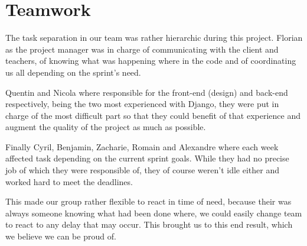 \section{Teamwork}
\label{sec:Teamwork}


The task separation in our team was rather hierarchic during this project. Florian as the project manager was in charge of communicating with the client and teachers, of knowing what was happening where in the code and of coordinating us all depending on the sprint's need. 

Quentin and Nicola where responsible for the front-end (design) and back-end respectively, being the two most experienced with Django, they were put in charge of the most difficult part so that they could benefit of that experience and augment the quality of the project as much as possible. 

Finally Cyril, Benjamin, Zacharie, Romain and Alexandre where each week affected task depending on the current sprint goals. While they had no precise job of which they were responsible of, they of course weren't idle either and worked hard to meet the deadlines.

This made our group rather flexible to react in time of need, because their was always someone knowing what had been done where, we could easily change team to react to any delay that may occur. This brought us to this end result, which we believe we can be proud of.

